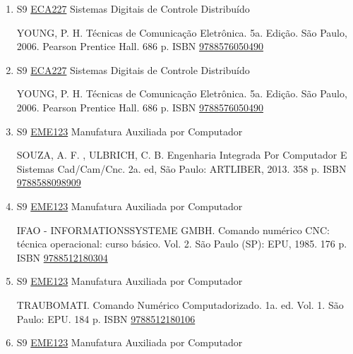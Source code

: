 \documentclass[12pt,a4paper]{book}
\begin{document}
\begin{enumerate}
 
 \item S9 \hyperref[PUD:ECA227]{ECA227} Sistemas Digitais de Controle Distribuído

  YOUNG, P.  H.  Técnicas de Comunicação Eletrônica.  5a.  Edição.  São Paulo, 2006.  Pearson Prentice Hall.  686 p.  ISBN \href{http://www.bn.br/site/pages/servicosProfissionais/agenciaISBN/isbnBusca/FbnBuscaISBNCatalogo.asp?pField=ISBN&pIntPagina=1&pISBN=76050490&nidbISBN=true&hidbISBN=true}{9788576050490}
 
 
 \item S9 \hyperref[PUD:ECA227]{ECA227} Sistemas Digitais de Controle Distribuído

  YOUNG, P.  H.  Técnicas de Comunicação Eletrônica.  5a.  Edição.  São Paulo, 2006.  Pearson Prentice Hall.  686 p.  ISBN \href{http://www.bn.br/site/pages/servicosProfissionais/agenciaISBN/isbnBusca/FbnBuscaISBNCatalogo.asp?pField=ISBN&pIntPagina=1&pISBN=76050490&nidbISBN=true&hidbISBN=true}{9788576050490}
 
 
 \item S9 \hyperref[PUD:EME123]{EME123} Manufatura Auxiliada por Computador

 SOUZA, A.  F. , ULBRICH, C.  B.  Engenharia Integrada Por Computador E Sistemas Cad/Cam/Cnc.  2a.  ed, São Paulo: ARTLIBER, 2013.  358 p.  ISBN \href{http://www.bn.br/site/pages/servicosProfissionais/agenciaISBN/isbnBusca/FbnBuscaISBNCatalogo.asp?pField=ISBN&pIntPagina=1&pISBN=88098909&nidbISBN=true&hidbISBN=true}{9788588098909}
 
 
 \item S9 \hyperref[PUD:EME123]{EME123} Manufatura Auxiliada por Computador

 IFAO - INFORMATIONSSYSTEME GMBH.  Comando numérico CNC: técnica operacional: curso básico.  Vol.  2.  São Paulo (SP): EPU, 1985.  176 p.  ISBN \href{http://www.bn.br/site/pages/servicosProfissionais/agenciaISBN/isbnBusca/FbnBuscaISBNCatalogo.asp?pField=ISBN&pIntPagina=1&pISBN=12180304&nidbISBN=true&hidbISBN=true}{9788512180304}
 
 
 \item S9 \hyperref[PUD:EME123]{EME123} Manufatura Auxiliada por Computador

 TRAUBOMATI.   Comando Numérico Computadorizado.  1a.  ed.  Vol.  1.  São Paulo: EPU.  184 p.  ISBN \href{http://www.bn.br/site/pages/servicosProfissionais/agenciaISBN/isbnBusca/FbnBuscaISBNCatalogo.asp?pField=ISBN&pIntPagina=1&pISBN=12180106&nidbISBN=true&hidbISBN=true}{9788512180106}
 
 
 \item S9 \hyperref[PUD:EME123]{EME123} Manufatura Auxiliada por Computador


\end{enumerate}
\end{document}
